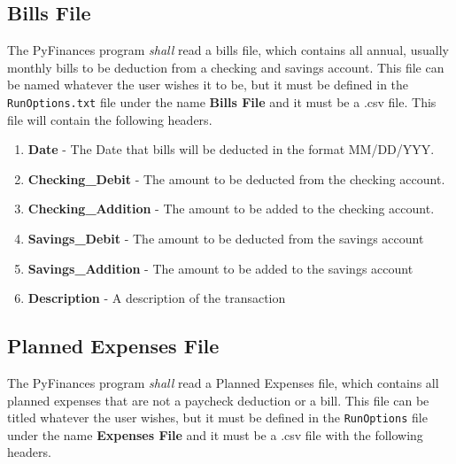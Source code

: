 {\subsection{Bills File}
The PyFinances program {\textit{shall}} read a bills file, which contains all
annual, usually monthly bills to be deduction from a checking and savings
account.
This file can be named whatever the user wishes it to be, but it must be defined
in the {\texttt{RunOptions.txt}} file under the name {\textbf{Bills File}} and
it must be a .csv file.  This file will contain the following headers.

\begin{enumerate}
    \item {\textbf{Date}} - The Date that bills will be deducted in the 
	                    format MM/DD/YYY.
    \item {\textbf{Checking\_Debit}} - The amount to be deducted from the 
	                               checking account.
    \item {\textbf{Checking\_Addition}} - The amount to be added to the 
	                                  checking account.
    \item {\textbf{Savings\_Debit}} - The amount to be deducted from the savings
	                              account
    \item {\textbf{Savings\_Addition}} - The amount to be added to the savings 
	                                 account 
    \item {\textbf{Description}} - A description of the transaction
\end{enumerate}

\subsection{Planned Expenses File}
The PyFinances program {\textit{shall}} read a Planned Expenses file, which 
contains all planned expenses that are not a paycheck deduction or a bill.
This file can be titled whatever the user wishes, but it must be defined in the
{\texttt{RunOptions}} file under the name {\textbf{Expenses File}} and it must be
a .csv file with the following headers.

}
